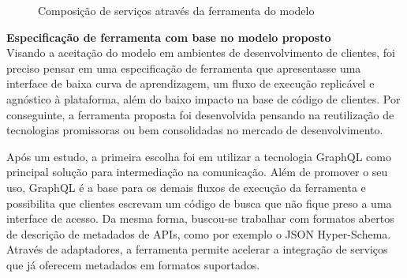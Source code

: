 \begin{figure}[H]
  \centering
  \caption{Composição de serviços através da ferramenta do modelo}
\end{figure}

\textbf{Especificação de ferramenta com base no modelo proposto} \\

Visando a aceitação do modelo em ambientes de desenvolvimento de clientes, foi preciso pensar em uma especificação de ferramenta que apresentasse uma interface de baixa curva de aprendizagem, um fluxo de execução replicável e agnóstico à plataforma, além do baixo impacto na base de código de clientes. Por conseguinte, a ferramenta proposta foi desenvolvida pensando na reutilização de tecnologias promissoras ou bem consolidadas no mercado de desenvolvimento.

Após um estudo, a primeira escolha foi em utilizar a tecnologia GraphQL como principal solução para intermediação na comunicação. Além de promover o seu uso, GraphQL é a base para os demais fluxos de execução da ferramenta e possibilita que clientes escrevam um código de busca que não fique preso a uma interface de acesso. Da mesma forma, buscou-se trabalhar com formatos abertos de descrição de metadados de APIs, como por exemplo o JSON Hyper-Schema. Através de adaptadores, a ferramenta permite acelerar a integração de serviços que já oferecem metadados em formatos suportados.

